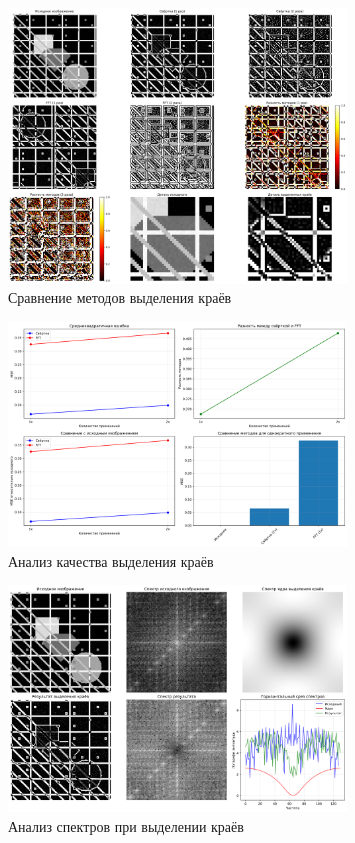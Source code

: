 \begin{figure}[H]
    \centering
    \includegraphics[width=0.8\textwidth]{images/task4/method_comparison.png}
    \caption{Сравнение методов выделения краёв}
    \label{fig:method_comparison_edge}
\end{figure}

\begin{figure}[H]
    \centering
    \includegraphics[width=0.8\textwidth]{images/task4/quality_analysis.png}
    \caption{Анализ качества выделения краёв}
    \label{fig:quality_analysis_edge}
\end{figure}

\begin{figure}[H]
    \centering
    \includegraphics[width=0.8\textwidth]{images/task4/spectrum_analysis.png}
    \caption{Анализ спектров при выделении краёв}
    \label{fig:spectrum_analysis_edge}
\end{figure}


